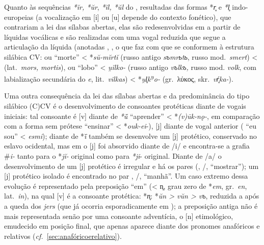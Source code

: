 Quanto às sequências \emph{*ĭr, *ŭr}, \emph{*ĭl, *ŭl} do ,
resultadas das formas *\emph{r̥} e \emph{*l̥} indo-europeias (a
vocalização em [i] ou [u] depende do contexto fonético), que
contrariam a lei das sílabas abertas, elas são redesenvolvidas em  a
partir de líquidas vocálicas e são realizadas com uma vogal reduzida que
segue a articulação da líquida (anotadas ,
, o que faz com que se conformem à estrutura
silábica CV\@:  ou 
``morte'' < *\emph{sŭ-mĭrtĭ} (russo antigo \emph{sъmrьtь}, russo mod.~\emph{smert\textquotesingle{}})
<  (lat.~\emph{mors,}
\emph{mortis}),  ou  ``lobo''
< \emph{u̯ĭlko-} (russo antigo \emph{vъlkъ,} russo mod.
\emph{volk}, com labialização secundária do \emph{e}, lit.~\emph{vilkas}) < *\emph{u̯l̥k\textsuperscript{u̯}o-} (gr.~λύκος,
skr.~\emph{vŕ̥ka-}).

Uma outra consequência da lei das sílabas abertas e da predominância do
tipo silábico {(C)}CV é o desenvolvimento de consoantes protéticas diante
de vogais iniciais: tal consoante é [v] diante de \emph{*ū̆}
 ``aprender'' < *\emph{(v)ūk-nǫ-}, em comparação com
a forma sem prótese  ``ensinar'' <
*\emph{ouk-ei}-), [j] diante de vogal anterior (
``eu sou'' < \emph{esmi}); diante de *\emph{ī̆} também se
desenvolve um [j] protético, conservado no eslavo ocidental, mas em
 o [j] foi absorvido diante de /i/ e encontra-se a grafia
\#\emph{i-} tanto para o *\emph{jĭ-} original como para \emph{*ji}-
original. Diante de /a/ o desenvolvimento de um [j] protético é
irregular e há os pares (, \slash{},
 ``mostrar''); um [j] protético isolado é encontrado no par
, \slash{},  ``manhã''.
Um caso extremo dessa evolução é
representado pela preposição  ``em'' (< n̥,
grau zero de *\emph{em}, gr.~\emph{en}, lat.~\emph{in}), na qual [v]
é a consoante protética: *\emph{n̥}: *\emph{ŭn > vŭn
	> vъ}, reduzida a  após a queda dos \emph{jers}
(que já ocorria esporadicamente em ); a preposição antiga não é mais
representada senão por uma consoante adventícia, o [n] etimológico,
emudecido em posição final, que apenas aparece diante dos pronomes
anafóricos e relativos (\emph{cf.}~\ref{sec:anafóricoerelativo}).

